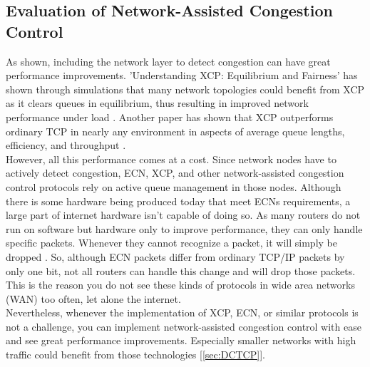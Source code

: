 \documentclass[a4paper,conference]{IEEEtran}
\begin{document}
\subsection{Evaluation of Network-Assisted Congestion Control}
As shown, including the network layer to detect congestion can have great performance improvements. 'Understanding XCP: Equilibrium and Fairness' has shown through simulations that many network topologies could benefit from XCP as it clears queues in equilibrium, thus resulting in improved network performance under load \cite{1498331}. Another paper has shown that XCP outperforms ordinary TCP in nearly any environment in aspects of average queue lengths, efficiency, and throughput \cite{katabi2002congestion}.
\\However, all this performance comes at a cost. Since network nodes have to actively detect congestion, ECN, XCP, and other network-assisted congestion control protocols rely on active queue management in those nodes. Although there is some hardware being produced today that meet ECNs requirements, a large part of internet hardware isn't capable of doing so. As many routers do not run on software but hardware only to improve performance, they can only handle specific packets. Whenever they cannot recognize a packet, it will simply be dropped \cite{katabi2002congestion}. So, although ECN packets differ from ordinary TCP/IP packets by only one bit, not all routers can handle this change and will drop those packets. This is the reason you do not see these kinds of protocols in wide area networks (WAN) too often, let alone the internet.
\\Nevertheless, whenever the implementation of XCP, ECN, or similar protocols is not a challenge, you can implement network-assisted congestion control with ease and see great performance improvements. Especially smaller networks with high traffic could benefit from those technologies [\autoref{sec:DCTCP}].
\end{document}
